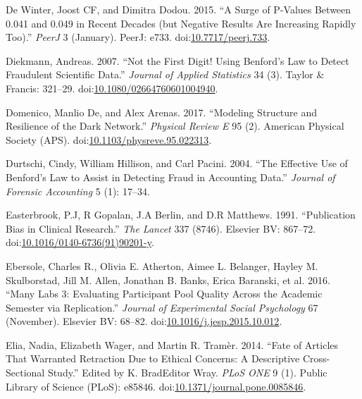 \documentclass[a5paper]{book}
\begin{document}
\hypertarget{ref-doi:10.7717ux2fpeerj.733}{}
De Winter, Joost CF, and Dimitra Dodou. 2015. ``A Surge of P-Values
Between 0.041 and 0.049 in Recent Decades (but Negative Results Are
Increasing Rapidly Too).'' \emph{PeerJ} 3 (January). PeerJ: e733.
doi:\href{https://doi.org/10.7717/peerj.733}{10.7717/peerj.733}.

\hypertarget{ref-doi:10.1080ux2f02664760601004940}{}
Diekmann, Andreas. 2007. ``Not the First Digit! Using Benford's Law to
Detect Fraudulent Scientific Data.'' \emph{Journal of Applied
Statistics} 34 (3). Taylor \& Francis: 321--29.
doi:\href{https://doi.org/10.1080/02664760601004940}{10.1080/02664760601004940}.

\hypertarget{ref-doi:10.1103ux2fphysreve.95.022313}{}
Domenico, Manlio De, and Alex Arenas. 2017. ``Modeling Structure and
Resilience of the Dark Network.'' \emph{Physical Review E} 95 (2).
American Physical Society (APS).
doi:\href{https://doi.org/10.1103/physreve.95.022313}{10.1103/physreve.95.022313}.

\hypertarget{ref-durtschi2004effective}{}
Durtschi, Cindy, William Hillison, and Carl Pacini. 2004. ``The
Effective Use of Benford's Law to Assist in Detecting Fraud in
Accounting Data.'' \emph{Journal of Forensic Accounting} 5 (1): 17--34.

\hypertarget{ref-doi:10.1016ux2f0140-6736_91_90201-y}{}
Easterbrook, P.J, R Gopalan, J.A Berlin, and D.R Matthews. 1991.
``Publication Bias in Clinical Research.'' \emph{The Lancet} 337 (8746).
Elsevier BV: 867--72.
doi:\href{https://doi.org/10.1016/0140-6736(91)90201-y}{10.1016/0140-6736(91)90201-y}.

\hypertarget{ref-doi:10.1016ux2fj.jesp.2015.10.012}{}
Ebersole, Charles R., Olivia E. Atherton, Aimee L. Belanger, Hayley M.
Skulborstad, Jill M. Allen, Jonathan B. Banks, Erica Baranski, et al.
2016. ``Many Labs 3: Evaluating Participant Pool Quality Across the
Academic Semester via Replication.'' \emph{Journal of Experimental
Social Psychology} 67 (November). Elsevier BV: 68--82.
doi:\href{https://doi.org/10.1016/j.jesp.2015.10.012}{10.1016/j.jesp.2015.10.012}.

\hypertarget{ref-doi:10.1371ux2fjournal.pone.0085846}{}
Elia, Nadia, Elizabeth Wager, and Martin R. Tramèr. 2014. ``Fate of
Articles That Warranted Retraction Due to Ethical Concerns: A
Descriptive Cross-Sectional Study.'' Edited by K. BradEditor Wray.
\emph{PLoS ONE} 9 (1). Public Library of Science (PLoS): e85846.
doi:\href{https://doi.org/10.1371/journal.pone.0085846}{10.1371/journal.pone.0085846}.
\end{document}
